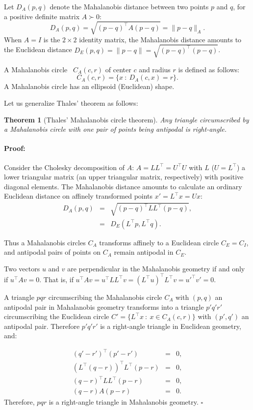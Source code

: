 \documentclass{article}
\newtheorem{theorem}{Theorem}
\newenvironment{proof}{\paragraph{Proof:}}{\hfill$\square$}
\begin{document}
Let $D_A(p,q)$ denote the Mahalanobis distance between two points $p$ and $q$, for a positive definite matrix $A\succ 0$:
$$
D_A(p,q)=\sqrt{(p-q)^\top A (p-q)}=\|p-q\|_A.
$$
When $A=I$ is the $2\times 2$ identity matrix, the Mahalanobis distance amounts to the Euclidean distance $D_E(p,q)=\|p-q\|=\sqrt{(p-q)^\top  (p-q)}$.

A Mahalanobis circle~\cite{nielsen-2008} $C_A(c,r)$ of center $c$ and radius $r$ is defined as follows:
$$
C_A(c,r)=\{ x\ :\ D_A(c,x)=r\}.
$$
A Mahalanobis circle has an ellipsoid (Euclidean) shape.

Let us generalize Thales' theorem as follows:

\begin{theorem}[Thales' Mahalanobis circle theorem]
Any triangle circumscribed by a Mahalanobis circle with one pair of points being   antipodal  is right-angle.
\end{theorem}


\begin{proof}
Consider the Cholesky decomposition of $A$: $A=LL^\top=U^\top U$ with $L$ ($U=L^\top$) a lower triangular matrix (an upper triangular matrix, respectively) with positive diagonal elements.
The Mahalanobis distance amounts to calculate an ordinary Euclidean distance on affinely transformed points  $x'=L^\top x=U x$:
\begin{eqnarray*}
D_A(p,q) &=& \sqrt{(p-q)^\top LL^\top (p-q)},\\
 &=& D_E(L^\top p,L^\top q).
\end{eqnarray*}

Thus a Mahalanobis circles $C_A$ transforms affinely to a Euclidean circle $C_E=C_I$, and antipodal pairs of points on $C_A$ 
remain antipodal in $C_E$.

Two vectors $u$ and $v$ are perpendicular in the Mahalanobis geometry  if and only if $u^\top A v=0$.
That is, if $u^\top A v= u^\top LL^\top v= (L^\top u)^\top L^\top v={u'}^\top v'=0$.
 
A triangle $pqr$ circumscribing the Mahalanobis circle $C_A$ with $(p,q)$ an antipodal pair in Mahalanobis geometry transforms into a
triangle $p'q'r'$ circumscribing the Euclidean circle $C'=\{L^\top x\ :\ x\in C_A(c,r) \}$ with $(p',q')$ an antipodal pair.
Therefore $p'q'r'$ is a right-angle triangle in Euclidean geometry, and:

\begin{eqnarray}
(q'-r')^\top (p'-r') &=& 0,\\
(L^\top(q-r))^\top L^\top (p-r) &=& 0,\\
(q-r)^\top L L^\top (p-r) &=&0,\\
(q-r) A (p-r) &=& 0.
\end{eqnarray}
Therefore, $pqr$ is a right-angle triangle in Mahalanobis geometry.
\end{proof}
\end{document}
